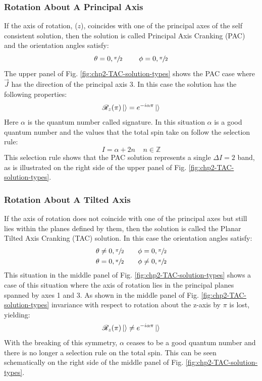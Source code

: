 \subsubsection{Rotation About A Principal Axis}
\label{sssec:models-tac-pac}
If the axis of rotation, ($z$), coincides with one of the principal axes of the self consistent solution, then the solution is called Principal Axis Cranking (PAC) and the orientation angles satisfy:
\begin{equation}
\label{eqn:chp2-PAC-angle-conditions}
\theta = 0, \sfrac{\pi}{2}~~~~~~~ \phi= 0, \sfrac{\pi}{2}
\end{equation}
The upper panel of Fig. \ref{fig:chp2-TAC-solution-types} shows the PAC case where $\vec{J}$ has the direction of the principal axis 3. In this case the solution has the following properties:
\begin{equation}
\label{eqn:chp2=TAC-PAC-sol-prop}
\mathscr{R}_z(\pi)\Ket{}=e^{-i\alpha\pi}\Ket{}
\end{equation}
Here $\alpha$ is the quantum number called signature. In this situation $\alpha$ is a good quantum number and the values that the total spin take on follow the selection rule:
\begin{equation}
\label{eqn:chp2=TAC-PAC-spin-sel-rule}
I=\alpha+2n ~~~~~n\in{}\mathds{Z}
\end{equation}
This selection rule shows that the PAC solution represents a single $\Delta{}I=2$ band, as is illustrated on the right side of the upper panel of Fig. \ref{fig:chp2-TAC-solution-types}.

\subsubsection{Rotation About A Tilted Axis}
\label{sssec:models-tac-tac}
If the axis of rotation does not coincide with one of the principal axes but still lies within the planes defined by them, then the solution is called the Planar Tilted Axis Cranking (TAC) solution. In this case the orientation angles satisfy:
\begin{align}
\theta &\neq{} 0, \sfrac{\pi}{2} ~~~~~~ \phi=0, \sfrac{\pi}{2}\\
\theta &= 0, \sfrac{\pi}{2} ~~~~~~ \phi\neq{}0, \sfrac{\pi}{2}
\end{align}
This situation in the middle panel of Fig. \ref{fig:chp2-TAC-solution-types} shows a case of this situation where the axis of rotation lies in the principal planes spanned by axes 1 and 3. As shown in the middle panel of Fig. \ref{fig:chp2-TAC-solution-types} invariance with respect to rotation about the z-axis by $\pi$ is lost, yielding:
\begin{equation}
\label{eqn:chp2=TAC-TAC-sol-prop}
\mathscr{R}_z(\pi)\Ket{}\neq{}e^{-i\alpha\pi}\Ket{}
\end{equation}
With the breaking of this symmetry, $\alpha$ ceases to be a good quantum number and there is no longer a selection rule on the total spin. This can be seen schematically on the right side of the middle panel of Fig. \ref{fig:chp2-TAC-solution-types}.

